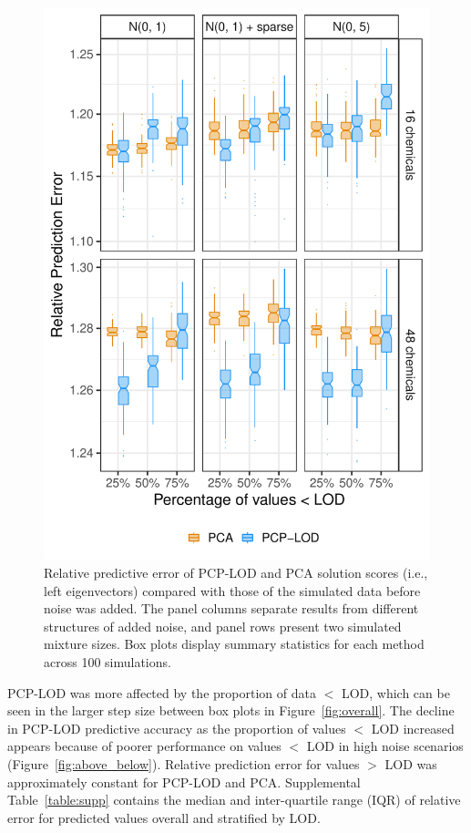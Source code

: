 \begin{figure}
    \centering
\includegraphics[width=.75\textwidth]{figures/svd_boxplots_left.pdf}
   \caption[Relative prediction error of PCP-LOD and PCA left eigenvectors]{Relative predictive error of PCP-LOD and PCA solution scores (i.e., left eigenvectors) compared with those of the simulated data before noise was added. The panel columns separate results from different structures of added noise, and panel rows present two simulated mixture sizes. Box plots display summary statistics for each method across 100 simulations.}
    \label{fig:svd}
\end{figure}

PCP-LOD was more affected by the proportion of data $<$ LOD, which can be seen in the larger step size between box plots in Figure~\ref{fig:overall}. The decline in PCP-LOD predictive accuracy as the proportion of values $<$ LOD increased appears because of poorer performance on values $<$ LOD in high noise scenarios (Figure~\ref{fig:above_below}). Relative prediction error for values $>$ LOD was approximately constant for PCP-LOD and PCA. Supplemental Table~\ref{table:supp} contains the median and inter-quartile range (IQR) of relative error for predicted values overall and stratified by LOD.

